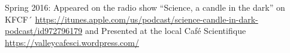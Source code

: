 \documentclass[10pt]{article}
\begin{document}

\spcp
Spring 2016: Appeared on the radio show ``Science, a candle in the dark'' on KFCF´
\url{https://itunes.apple.com/us/podcast/science-candle-in-dark-podcast/id972796179} and Presented at the local Caf\'e Scientifique \url{https://valleycafesci.wordpress.com/}




%
\end{document}
